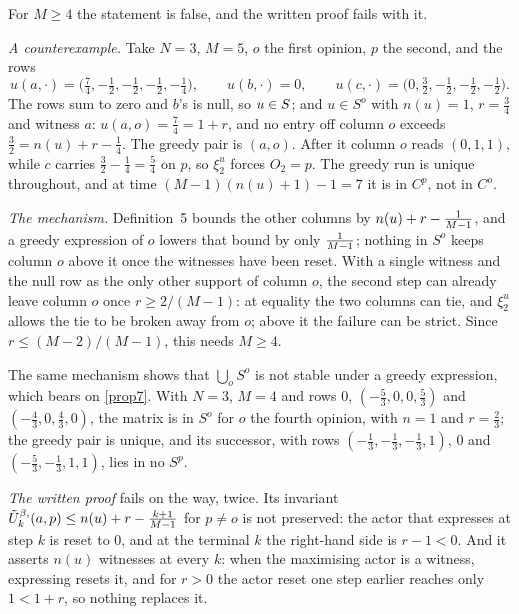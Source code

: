 \begin{remark}
  \label{note-lem20}
  For $M \ge 4$ the statement is false, and the written proof fails with it.

  \emph{A counterexample.}  Take $N = 3$, $M = 5$, $o$ the first opinion, $p$ the
  second, and the rows
  \[
    u(a,\cdot) = \bigl(\tfrac74, -\tfrac12, -\tfrac12, -\tfrac12, -\tfrac14\bigr),
    \qquad u(b,\cdot) = 0, \qquad
    u(c,\cdot) = \bigl(0, \tfrac32, -\tfrac12, -\tfrac12, -\tfrac12\bigr).
  \]
  The rows sum to zero and $b$'s is null, so $u \in S$; and $u \in S^o$
  with $n(u) = 1$, $r = \tfrac34$ and witness $a$: $u(a,o) = \tfrac74 = 1 + r$,
  and no entry off column $o$ exceeds $\tfrac32 = n(u) + r - \tfrac14$.  The
  greedy pair is $(a, o)$.  After it column $o$ reads $(0, 1, 1)$, while $c$
  carries $\tfrac32 - \tfrac14 = \tfrac54$ on $p$, so $\xi_2^u$ forces $O_2 = p$.
  The greedy run is unique throughout, and at time $(M-1)(n(u)+1) - 1 = 7$ it is
  in $C^p$, not in $C^o$.

  \emph{The mechanism.}  Definition~5 bounds the other columns by $n(u) + r -
  \tfrac{1}{M-1}$, and a greedy expression of $o$ lowers that bound by only
  $\tfrac{1}{M-1}$; nothing in $S^o$ keeps column $o$ above it once the witnesses
  have been reset.  With a single witness and the null row as the only other
  support of column $o$, the second step can already leave column $o$ once $r
  \ge 2/(M-1)$: at equality the two columns can tie, and $\xi_2^u$ allows the
  tie to be broken away from $o$; above it the failure can be strict.  Since $r \le (M-2)/(M-1)$, this
  needs $M \ge 4$.

  The same mechanism shows that $\bigcup_o S^o$ is not stable under a greedy
  expression, which bears on \ref{prop7}.  With $N = 3$, $M = 4$ and rows $0$,
  $(-\tfrac53, 0, 0, \tfrac53)$ and $(-\tfrac43, 0, \tfrac43, 0)$, the matrix is
  in $S^{o}$ for $o$ the fourth opinion, with $n = 1$ and $r = \tfrac23$; the
  greedy pair is unique, and its successor, with rows $(-\tfrac13, -\tfrac13,
  -\tfrac13, 1)$, $0$ and $(-\tfrac53, -\tfrac13, 1, 1)$, lies in no $S^{p}$.

  \emph{The written proof} fails on the way, twice.  Its invariant
  $\tilde{U}^{\beta,}_k(a,p) \le n(u) + r - \tfrac{k+1}{M-1}$ for $p \ne o$ is not
  preserved: the actor that expresses at step $k$ is reset to $0$, and at the
  terminal $k$ the right-hand side is $r - 1 < 0$.  And it asserts $n(u)$
  witnesses at every $k$: when the maximising actor is a witness, expressing
  resets it, and for $r > 0$ the actor reset one step earlier reaches only
  $1 < 1 + r$, so nothing replaces it.


\end{remark}
